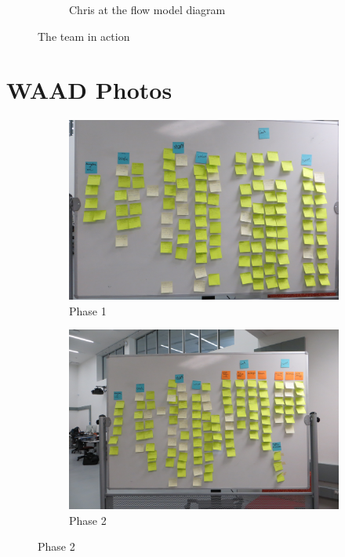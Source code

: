 \documentclass[12pt]{article} %
\begin{document}
\begin{figure}[H]
\begin{subfigure}{\linewidth}
      \caption{Chris at the flow model diagram}
      \label{fig:team_photo_4}
    \end{subfigure}
    \caption{The team in action}
    \label{fig:test}
  \end{figure}

\section{WAAD Photos} %
  \begin{figure}[H]
    \begin{subfigure}{.5\linewidth}
      \centering
      \includegraphics[width=0.95\linewidth]{WAAD_version1}
      \caption{Phase 1}
      \label{fig:WAAD_version1}
    \end{subfigure}%
    \begin{subfigure}{.5\linewidth}
      \centering
      \includegraphics[width=0.95\linewidth]{WAAD_version2}
      \caption{Phase 2}

\end{subfigure}
\end{figure}
\end{document}
